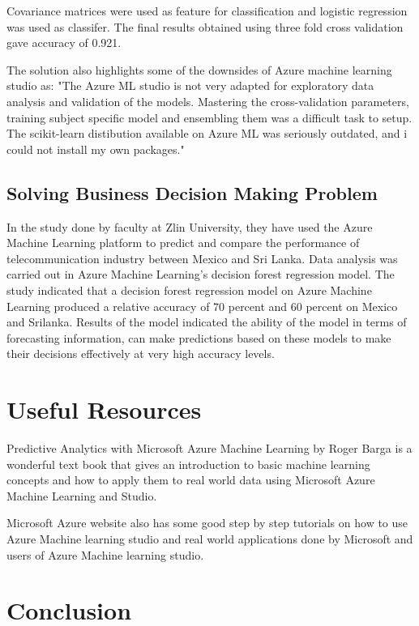 \documentclass[9pt,twocolumn,twoside]{../../styles/osajnl}
\begin{document}
Covariance matrices were used as feature for classification and
logistic regression was used as classifer. The final results obtained
using three fold cross validation gave accuracy of 0.921.

The solution also highlights some of the downsides of Azure machine
learning studio as: "The Azure ML studio is not very adapted for
exploratory data analysis and validation of the models. Mastering the
cross-validation parameters, training subject specific model and
ensembling them was a difficult task to setup. The scikit-learn
distibution available on Azure ML was seriously outdated, and i could
not install my own packages."\cite{www-solutionDecodeBrainSignal}

\subsection{Solving Business Decision Making Problem}
In the study done by faculty at Zlin
University\cite{businessDecisionAzureML}, they have used the Azure
Machine Learning platform to predict and compare the performance of
telecommunication industry between Mexico and Sri Lanka. Data analysis
was carried out in Azure Machine Learning's decision forest regression
model. The study indicated that a decision forest regression model on
Azure Machine Learning produced a relative accuracy of 70 percent and
60 percent on Mexico and Srilanka.  Results of the model indicated the
ability of the model in terms of forecasting information, can make
predictions based on these models to make their decisions effectively
at very high accuracy levels.


\section{Useful Resources}

{Predictive Analytics with Microsoft Azure Machine Learning}
\cite{book-azureml} by Roger Barga is a wonderful text book that gives
an introduction to basic machine learning concepts and how to apply
them to real world data using Microsoft Azure Machine Learning and
Studio.

{Microsoft Azure website}\cite{www-azureMLSite} also has some good
step by step tutorials on how to use Azure Machine learning studio and
real world applications done by Microsoft and users of Azure Machine
learning studio.

\section{Conclusion}
\end{document}
